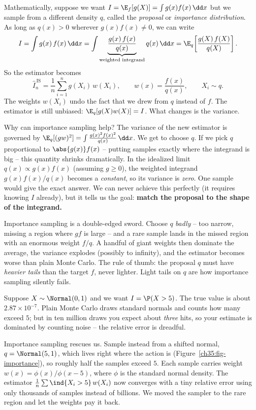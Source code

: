 Mathematically, suppose we want $I = \E_f[g(X)] = \int g(x) f(x)\,\dd x$ but we
sample from a different density $q$, called the \emph{proposal} or \emph{importance
distribution}. As long as $q(x) > 0$ wherever $g(x)f(x) \ne 0$, we can write
\[
  I = \int g(x)\,f(x)\,\dd x
    = \int \underbrace{\frac{g(x)\,f(x)}{q(x)}}_{\text{weighted integrand}} q(x)\,\dd x
    = \E_q\!\left[\frac{g(X)\,f(X)}{q(X)}\right].
\]
So the estimator becomes
\[
  \hat I_n^{\,\mathrm{IS}} = \frac1n \sum_{i=1}^n g(X_i)\,w(X_i),
  \qquad w(x) = \frac{f(x)}{q(x)},
  \qquad X_i \sim q.
\]
The weights $w(X_i)$ undo the fact that we drew from $q$ instead of $f$. The
estimator is still unbiased: $\E_q[g(X)w(X)] = I$. What changes is the variance.

\begin{whybox}
Why can importance sampling help? The variance of the new estimator is governed
by $\E_q[(gw)^2] = \int \frac{g(x)^2 f(x)^2}{q(x)}\,\dd x$. We get to choose $q$.
If we pick $q$ proportional to $\abs{g(x)}f(x)$ -- putting samples exactly where
the integrand is big -- this quantity shrinks dramatically. In the idealized
limit $q(x) \propto g(x) f(x)$ (assuming $g \ge 0$), the weighted integrand
$g(x)f(x)/q(x)$ becomes a \emph{constant}, so its variance is \emph{zero}. One
sample would give the exact answer. We can never achieve this perfectly (it
requires knowing $I$ already), but it tells us the goal: \textbf{match the
proposal to the shape of the integrand.}
\end{whybox}

\begin{trapbox}
Importance sampling is a double-edged sword. Choose $q$ \emph{badly} -- too narrow,
missing a region where $gf$ is large -- and a rare sample lands in the missed
region with an enormous weight $f/q$. A handful of giant weights then dominate
the average, the variance explodes (possibly to infinity), and the estimator
becomes worse than plain Monte Carlo. The rule of thumb: the proposal $q$ must
have \emph{heavier tails} than the target $f$, never lighter. Light tails on $q$
are how importance sampling silently fails.
\end{trapbox}

\begin{example}
\label{ch35:ex-rare}
Suppose $X \sim \Normal(0,1)$ and we want $I = \P(X > 5)$. The true value is about
$2.87\times 10^{-7}$. Plain Monte Carlo draws standard normals and counts how many
exceed $5$; but in ten million draws you expect about \emph{three} hits, so your
estimate is dominated by counting noise -- the relative error is dreadful.

Importance sampling rescues us. Sample instead from a shifted normal,
$q = \Normal(5,1)$, which lives right where the action is
(Figure~\ref{ch35:fig-importance}), so roughly half the
samples exceed $5$. Each sample carries weight $w(x) = \phi(x)/\phi(x-5)$, where
$\phi$ is the standard normal density. The estimator
$\frac1n\sum \ind\{X_i > 5\}\,w(X_i)$ now converges with a tiny relative error
using only thousands of samples instead of billions. We moved the sampler to the
rare region and let the weights pay it back.
\end{example}

